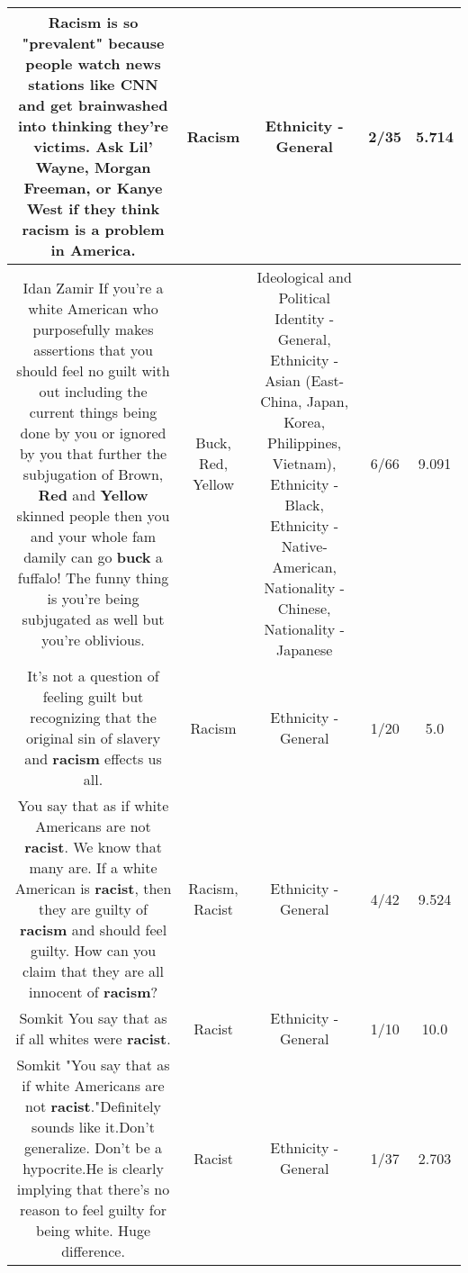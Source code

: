\documentclass[11pt]{article}
\newlength\mylength
\begin{document}
\begin{center}
\begin{longtable}{|C{.65\mylength}|C{.30\mylength}|C{.12\mylength}|C{.12\mylength}|C{.12\mylength}|}
  \small Racism is so "prevalent" because people watch news stations like CNN and get brainwashed into thinking they're victims. Ask Lil' Wayne, Morgan Freeman, or Kanye West if they think \textbf{racism} is a problem in America.\normalsize   & Racism & Ethnicity - General & 2/35 & 5.714 \\  \hline
  \small Idan Zamir  If you're a white American who purposefully makes assertions that you should feel no guilt with out including the current things being done by you or ignored by you that further the subjugation of  Brown, \textbf{R\textbf{ed}} and \textbf{Y\textbf{e\textbf{llow}}} skinned people then you and your whole fam damily can go \textbf{buck} a fuffalo!  The funny thing is you're being subjugated as well but you're oblivious.\normalsize   & Buck, Red, Yellow &  Ideological and Political Identity - General, Ethnicity - Asian (East- China, Japan, Korea, Philippines, Vietnam), Ethnicity - Black, Ethnicity - Native-American, Nationality - Chinese, Nationality - Japanese & 6/66 & 9.091 \\  \hline
  \small It's not a question of feeling guilt but recognizing that the original sin of slavery and \textbf{racism} effects us all.\normalsize   & Racism & Ethnicity - General & 1/20 & 5.0 \\  \hline
  \small You say that as if white Americans are not \textbf{racist}. We know that many are. If a white American is \textbf{racist}, then they are guilty of \textbf{racism} and should feel guilty. How can you claim that they are all innocent of \textbf{racism}?\normalsize   & Racism, Racist & Ethnicity - General & 4/42 & 9.524 \\  \hline
  \small Somkit You say that as if all whites were \textbf{racist}.\normalsize   & Racist & Ethnicity - General & 1/10 & 10.0 \\  \hline
  \small Somkit "You say that as if white Americans are not \textbf{racist}."Definitely sounds like it.Don't generalize. Don't be a hypocrite.He is clearly implying that there's no reason to feel guilty for being white. Huge difference.\normalsize   & Racist & Ethnicity - General & 1/37 & 2.703 \\  \hline

\end{longtable}
\end{center}
\end{document}
